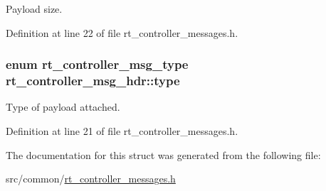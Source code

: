 Payload size. 



Definition at line 22 of file rt\-\_\-controller\-\_\-messages.\-h.

\hypertarget{structrt__controller__msg__hdr_aeaaded0407c30884b04405eae9ecc9f3}{
\subsubsection[{type}]{\setlength{\rightskip}{0pt plus 5cm}enum {\bf rt\-\_\-controller\-\_\-msg\-\_\-type} rt\-\_\-controller\-\_\-msg\-\_\-hdr\-::type}}\label{structrt__controller__msg__hdr_aeaaded0407c30884b04405eae9ecc9f3}


Type of payload attached. 



Definition at line 21 of file rt\-\_\-controller\-\_\-messages.\-h.



The documentation for this struct was generated from the following file\-:\begin{DoxyCompactItemize}
\item 
src/common/\hyperlink{rt__controller__messages_8h}{rt\-\_\-controller\-\_\-messages.\-h}\end{DoxyCompactItemize}
